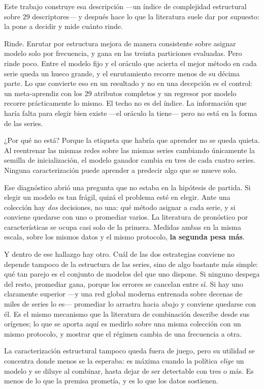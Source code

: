 Este trabajo construye esa descripción ---un índice de complejidad estructural sobre 29
descriptores--- y después hace lo que la literatura suele dar por supuesto: la pone a
decidir y mide cuánto rinde.

Rinde. Enrutar por estructura mejora de manera consistente sobre asignar modelo solo por
frecuencia, y gana en las treinta particiones evaluadas. Pero rinde poco. Entre el modelo
fijo y el oráculo que acierta el mejor método en cada serie queda un hueco grande, y el
enrutamiento recorre menos de su décima parte. Lo que convierte eso en un resultado y no
en una decepción es el control: un meta-aprendiz con los 29 atributos completos y un
regresor por modelo recorre prácticamente lo mismo. El techo no es del índice. La
información que haría falta para elegir bien existe ---el oráculo la tiene--- pero no
está en la forma de las series.

¿Por qué no está? Porque la etiqueta que habría que aprender no se queda quieta. Al
reentrenar las mismas redes sobre las mismas series cambiando únicamente la semilla de
inicialización, el modelo ganador cambia en tres de cada cuatro series. Ninguna
caracterización puede aprender a predecir algo que se mueve solo.

Ese diagnóstico abrió una pregunta que no estaba en la hipótesis de partida. Si elegir un
modelo es tan frágil, quizá el problema esté en elegir. Ante una colección hay
\emph{dos} decisiones, no una: qué método asignar a cada serie, y si conviene quedarse
con uno o promediar varios. La literatura de pronóstico por características se ocupa casi
solo de la primera. Medidas ambas en la misma escala, sobre los mismos datos y el mismo
protocolo, \textbf{la segunda pesa más}.

Y dentro de ese hallazgo hay otro. Cuál de las dos estrategias conviene no depende
tampoco de la estructura de las series, sino de algo bastante más simple: qué tan parejo
es el conjunto de modelos del que uno dispone. Si ninguno despega del resto, promediar
gana, porque los errores se cancelan entre sí. Si hay uno claramente superior ---y una
red global moderna entrenada sobre decenas de miles de series lo es--- promediar lo
arrastra hacia abajo y conviene quedarse con él. Es el mismo mecanismo que la literatura
de combinación describe desde sus orígenes; lo que se aporta aquí es medirlo sobre una
misma colección con un mismo protocolo, y mostrar que el régimen cambia de una frecuencia
a otra.

La caracterización estructural tampoco queda fuera de juego, pero su utilidad se
concentra donde menos se la esperaba: es máxima cuando la política \emph{elige} un modelo
y se diluye al combinar, hasta dejar de ser detectable con tres o más. Es menos de lo que
la premisa prometía, y es lo que los datos sostienen.

